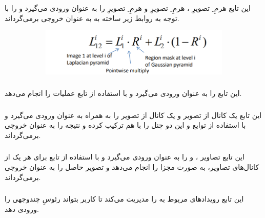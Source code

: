 \documentclass[a4paper,12pt]{article}
\begin{document}
	\subsubsection*{}
	این تابع هرمِ 
	ِ
	تصویرِ
	،
	هرمِ
	ِ
	تصویرِ
	و
	 هرمِ
	 ِ
	 تصویرِ
	 را به عنوان ورودی می‌گیرد و 
	 را با توجه به روابط زیر ساخته به به عنوان خروجی بر‌می‌گرداند.
	 \begin{figure}[H]
	 	\centering
	 	\begin{subfigure}{0.9\textwidth}
	 		\centering
	 		\includegraphics[width=\textwidth]{1.png}
	 	\end{subfigure}
	 \end{figure}
 \subsubsection*{}
	 این تابع 
	 را به عنوان ورودی می‌گیرد و با استفاده از تابع
	 عملیات 
	 را انجام می‌دهد.
	\subsubsection*{}
	این تابع یک کانال از تصویر
	و یک کانال از تصویر
	را به همراه 
	به عنوان ورودی می‌گیرد و با استفاده از توابع 
	و
	این دو چنل را با هم ترکیب کرده و نتیجه را به عنوان خروجی بر‌می‌گرداند.
	\subsubsection*{}
	این تابع تصاویر 
	،
	و
	را به عنوان ورودی می‌گیرد و با استفاده از تابع 
	برای هر یک از کانال‌های تصاویر، به صورت مجزا 
	را انجام می‌دهد و تصویر حاصل را به عنوان خروجی بر‌می‌گرداند.
	\subsubsection*{}
	این تابع رویدادهای مربوط به 
	را مدیریت می‌کند تا کاربر بتواند رئوسِ چندوجهی 
	را ورودی دهد.
\end{document}
